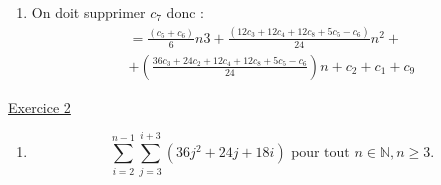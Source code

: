 \documentclass[11pt]{article}
\begin{document}
\begin{enumerate}[label=\Roman*.]
\begin{enumerate}[label=\alph*)]
     \item 
     On doit supprimer $c_7$ donc :
             \begin{multline*}
            = \frac{(c_5+c_6)}{6}n3+\frac{(12c_3+12c_4+12c_8+5c_5-c_6)}{24}n^{2}+\\
            +\left(\frac{36c_3+24c_2+12c_4+12c_8+5c_5-c_6}{24}\right)n+c_2+c_1 + c_9  
         \end{multline*}

    \end{enumerate}

\end{enumerate}

\bigskip

\underline{Exercice 2} 

\begin{enumerate}[label=\alph*)]

     \item $$ \sum_{i=2}^{n-1} \sum_{j=3}^{i+3}\left( 36j^2+24j+18i \right)  \textrm{ pour tout } n \in \mathbb{N}, n\geq 3.$$
     

\end{enumerate}
\end{document}
